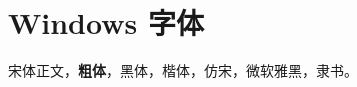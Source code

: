 \documentclass[fontset=windows,UTF8]{ctexart}
\begin{document}
\section{Windows 字体}
宋体正文，\textbf{粗体}，{\heiti 黑体}，{\kaishu 楷体}，{\fangsong 仿宋}，{\yahei 微软雅黑}，{\lishu 隶书}。
\end{document}
